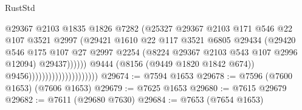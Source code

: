 \begin{lexlean}{RustStd}
\begin{coremodule}
                                                    @29367
                                                    @2103
                                                    @1835
                                                    @1826
                                                    @7282
                                                    (@25327
                                                      @29367
                                                      @2103
                                                      @171
                                                      @546
                                                      @22
                                                      @107
                                                      @3521
                                                      @2997
                                                      (@29421
                                                        @1610
                                                        @22
                                                        @117
                                                        @3521
                                                        @6805
                                                        @29434
                                                        (@29420
                                                          @546
                                                          @175
                                                          @107
                                                          @27
                                                          @2997
                                                          @2254
                                                          (@8224
                                                            @29367
                                                            @2103
                                                            @543
                                                            @107
                                                            @2996
                                                            @12094)
                                                          @29437))))))
                                              @9444
                                              (@8156 (@9449 @1820 @1842 @674))
                                              @9456)))))))))))))))))))))
@29674 := @7594 @1653
@29678 := @7596 (@7600 @1653) (@7606 @1653)
@29679 := @7625 @1653
@29680 := @7615 @29679
@29682 := @7611 (@29680 @7630)
@29684 := @7653 (@7654 @1653)

\end{coremodule}
\end{lexlean}
